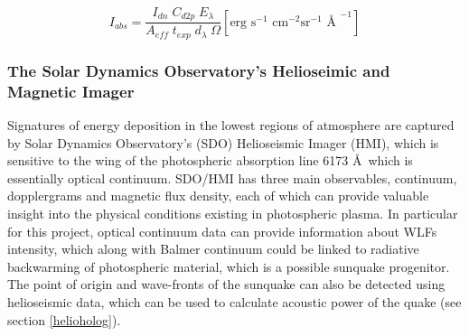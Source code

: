 \begin{equation}\label{irisradiometriccal}
I_{abs} = \frac{{I_{dn}} \; {C_{d2p}} \; {E_{\lambda}}}{{A_{eff}} \; {t_{exp}} \; {d_{\lambda}} \; {\Omega}} [\text{erg s}^{-1}\text{ cm}^{-2}\text{sr}^{-1}\text{ \AA\ }^{-1}]
\end{equation}



\subsubsection{The Solar Dynamics Observatory's Helioseimic and Magnetic Imager}
Signatures of energy deposition in the lowest regions of atmosphere are captured by Solar Dynamics Observatory's (SDO) Helioseismic Imager (HMI), which is sensitive to the wing of the photospheric absorption line 6173 \AA\, which is essentially optical continuum. SDO/HMI has three main observables, continuum, dopplergrams and magnetic flux density, each of which can provide valuable insight into the physical conditions existing in photospheric plasma. In particular for this project, optical continuum data can provide information about WLFs intensity, which along with Balmer continuum could be linked to radiative backwarming of photospheric material, which is a possible sunquake progenitor. The point of origin and wave-fronts of the sunquake can also be detected using helioseismic data, which can be used to calculate acoustic power of the quake (see section \ref{helioholog}).
